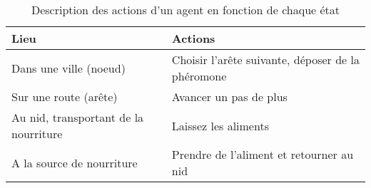 
\begin{table}[H]
\centering
\begin{tabular}{@{}ll@{}}
\toprule
Lieu                                  & Actions                                           \\ \midrule
Dans une ville (noeud)                & Choisir l’arête suivante, déposer de la phéromone \\
Sur une route (arête)                 & Avancer un pas de plus                            \\
Au nid, transportant de la nourriture & Laissez les aliments                              \\
A la source de nourriture             & Prendre de l’aliment et retourner au nid          \\ \bottomrule
\end{tabular}
\caption{Description des actions d’un agent en fonction de chaque état}
\label{tab:Description_des_action_dun_agent_en_fonction_de_chaque_etat}
\end{table}